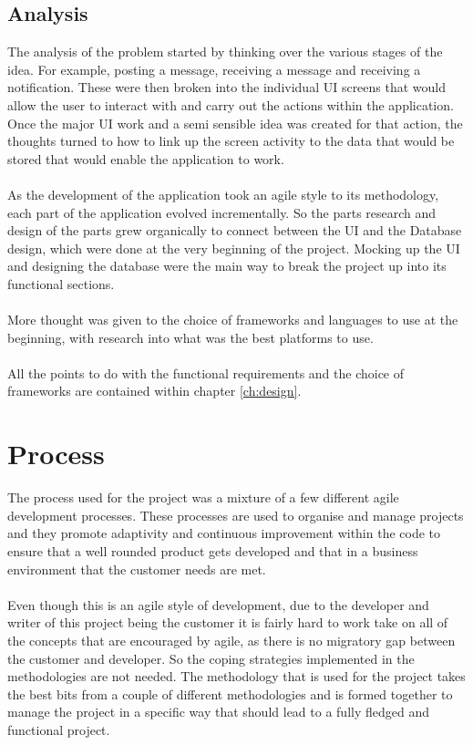 \subsection{Analysis}

The analysis of the problem started by thinking over the various stages of the idea. For example, posting a message, receiving a message and receiving a notification. These were then broken into the individual UI screens that would allow the user to interact with and carry out the actions within the application. Once the major UI work and a semi sensible idea was created for that action, the thoughts turned to how to link up the screen activity to the data that would be stored that would enable the application to work.\\
\\
As the development of the application took an agile style to its methodology, each part of the application evolved incrementally. So the parts research and design of the parts grew organically to connect between the UI and the Database design, which were done at the very beginning of the project. Mocking up the UI and designing the database were the main way to break the project up into its functional sections.\\
\\
More thought was given to the choice of frameworks and languages to use at the beginning, with research into what was the best platforms to use.\\
\\
All the points to do with the functional requirements and the choice of frameworks are contained within chapter \ref{ch:design}.

\section{Process}

The process used for the project was a mixture of a few different agile development processes. These processes are used to organise and manage projects and they promote adaptivity and continuous improvement within the code to ensure that a well rounded product gets developed and that in a business environment that the customer needs are met.\\
\\
Even though this is an agile style of development, due to the developer and writer of this project being the customer it is fairly hard to work take on all of the concepts that are encouraged by agile, as there is no migratory gap between the customer and developer. So the coping strategies implemented in the methodologies are not needed. The methodology that is used for the project takes the best bits from a couple of different methodologies and is formed together to manage the project in a specific way that should lead to a fully fledged and functional project.

